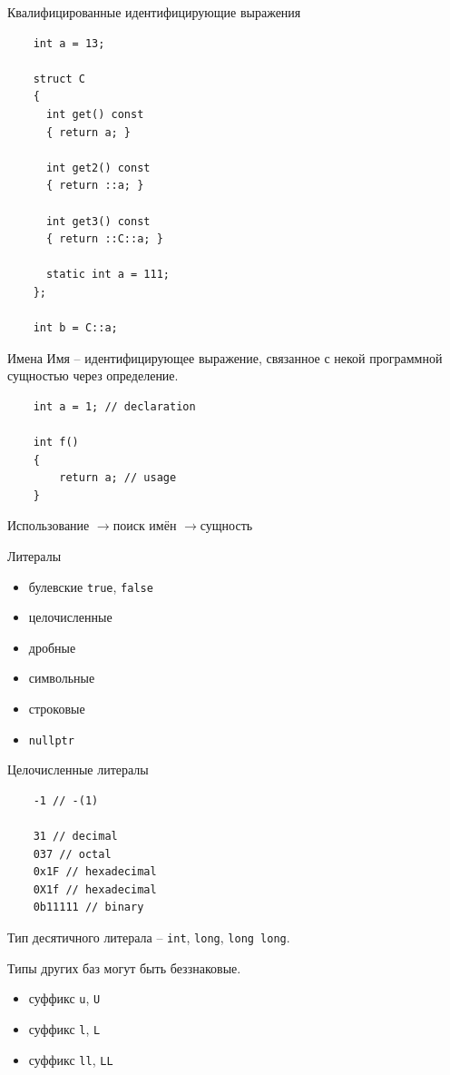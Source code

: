 \documentclass[unknownkeysallowed,xcolor=table]{beamer}
\newcommand{\rarr}{$\rightarrow$}
\begin{document}
\begin{frame}[fragile]{Квалифицированные идентифицирующие выражения}
  \begin{lstlisting}
    int a = 13;

    struct C
    {
      int get() const
      { return a; }

      int get2() const
      { return ::a; }

      int get3() const
      { return ::C::a; }

      static int a = 111;
    };

    int b = C::a;
  \end{lstlisting}
\end{frame}

\begin{frame}[fragile]{Имена}
  Имя -- идентифицирующее выражение, связанное с некой программной сущностью через определение. \vspace{2em}
  \begin{lstlisting}
    int a = 1; // declaration

    int f()
    {
        return a; // usage
    }
  \end{lstlisting}
  \vspace{2em}
  Использование \rarr поиск имён \rarr сущность
\end{frame}

\begin{frame}[fragile]{Литералы}
  \begin{itemize}
    \item булевские \lstinline{true}, \lstinline{false}
    \item целочисленные
    \item дробные
    \item символьные
    \item строковые
    \item \lstinline{nullptr}
  \end{itemize}
\end{frame}

\begin{frame}[fragile]{Целочисленные литералы}
  \begin{lstlisting}
    -1 // -(1)

    31 // decimal
    037 // octal
    0x1F // hexadecimal
    0X1f // hexadecimal
    0b11111 // binary
  \end{lstlisting}
  Тип десятичного литерала -- \lstinline{int}, \lstinline{long}, \lstinline{long long}. \\
  
  \vspace{1em}
  
  Типы других баз могут быть беззнаковые.
  \begin{itemize}
    \item суффикс \lstinline{u}, \lstinline{U}
    \item суффикс \lstinline{l}, \lstinline{L}
    \item суффикс \lstinline{ll}, \lstinline{LL}
  \end{itemize}
\end{frame}
\end{document}
